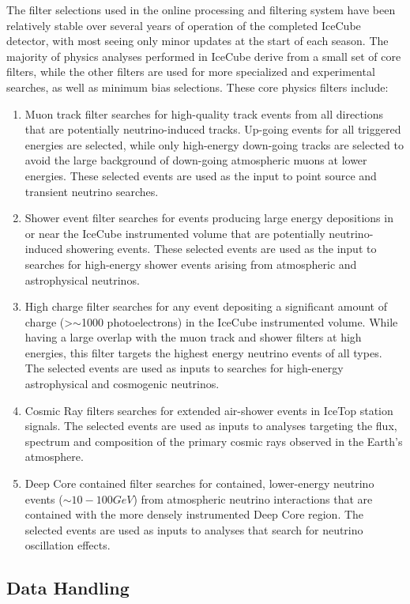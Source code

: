 The filter selections used in the online processing and filtering system have been relatively stable
over several years of operation of the completed IceCube detector, with most seeing only minor updates at the start of
each season.  The majority of physics analyses performed in IceCube derive from a small set of core filters, while the other
filters are used for more specialized and experimental searches, as well as minimum bias selections.  These core physics filters include:
\begin{enumerate}
\item Muon track filter searches for high-quality track events from all directions that are potentially
neutrino-induced tracks.  Up-going events for all triggered energies are selected, while only high-energy down-going tracks are
selected to avoid the large background of down-going atmospheric muons at lower energies.  These selected events are used
as the input to point source and transient neutrino searches.
\item Shower event filter searches for events producing large energy depositions in or near the IceCube instrumented volume that
are potentially neutrino-induced showering events.  These selected events are used as the input to searches for 
high-energy shower events arising from atmospheric and astrophysical neutrinos.  
\item High charge filter searches for any event depositing a significant amount of charge (\textgreater $\sim$1000 photoelectrons) 
in the IceCube instrumented volume.  While having a large overlap with the muon track and shower filters at high energies,
this filter targets the highest energy neutrino events of all types. The selected events are used as inputs to searches
for high-energy astrophysical and cosmogenic neutrinos.
\item Cosmic Ray filters searches for extended air-shower events in IceTop station signals.  The selected events
are used as inputs to analyses targeting the flux, spectrum and composition of the primary cosmic rays observed in the
Earth's atmosphere.
\item Deep Core contained filter searches for contained, lower-energy neutrino events ($\sim10-100 GeV$)
from atmospheric neutrino interactions that are contained with the more densely instrumented Deep Core region.  The selected
events are used as inputs to analyses that search for neutrino oscillation effects.
\end{enumerate}
\subsection{\label{sect:online_jade}Data Handling}

